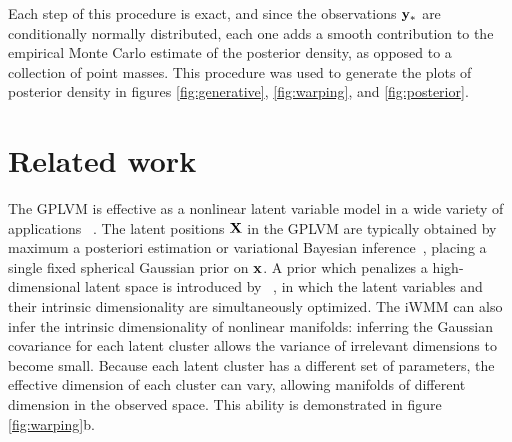 Each step of this procedure is exact, and since the observations ${\bf{y}}_{*}$ are conditionally normally distributed, each one adds a smooth contribution to the empirical Monte Carlo estimate of the posterior density, as opposed to a collection of point masses.  This procedure was used to generate the plots of posterior density in figures \ref{fig:generative}, \ref{fig:warping}, and \ref{fig:posterior}.

\section{Related work}

The GPLVM is effective as a nonlinear latent variable model in a wide variety of applications ~\cite{lawrence2004gaussian,salzmann2008local,lawrence2009non}.
The latent positions $\mathbf{X}$ in the GPLVM are typically obtained by maximum a posteriori estimation or variational Bayesian inference~\cite{titsias2010bayesian}, placing a single fixed spherical Gaussian prior on ${\bf{x}}$.
A prior which penalizes a high-dimensional latent space is introduced by ~\cite{geiger2009rank}, in which the latent variables and their intrinsic dimensionality are simultaneously optimized.
The iWMM can also infer the intrinsic dimensionality of nonlinear manifolds:
inferring the Gaussian covariance for each latent cluster allows the variance of irrelevant dimensions to become small.  
Because each latent cluster has a different set of parameters, the effective dimension of each cluster can vary, allowing manifolds of different dimension in the observed space.  This ability is demonstrated in figure \ref{fig:warping}b.

